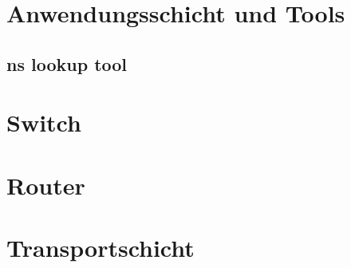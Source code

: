 \documentclass{scrartcl}
\begin{document}
 
  \newpage
\section[Versuch 3 Anwendungsschicht und Tools]{Anwendungsschicht und Tools}

  \subsection[Aufgabe 4 ns lookup tool]{ns lookup tool}


  \newpage
\section[Versuch 4 Switch]{Switch}


  \newpage
\section[Versuch 5 Router]{Router}
 
 
  \newpage
\section[Versuch 6 Transportschicht]{Transportschicht}
  
\end{document}
